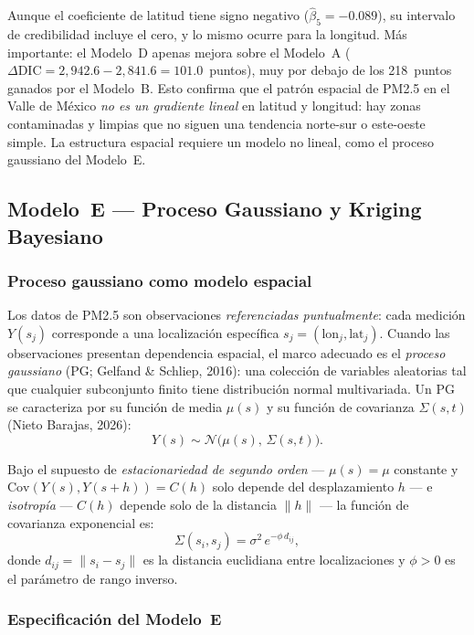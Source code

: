 \documentclass[12pt]{article}
\begin{document}
Aunque el coeficiente de latitud tiene signo negativo
($\hat\beta_5 = -0.089$), su intervalo de credibilidad incluye el cero,
y lo mismo ocurre para la longitud.
M\'as importante: el Modelo~D apenas mejora sobre el Modelo~A
($\Delta\text{DIC} = 2{,}942.6 - 2{,}841.6 = 101.0$~puntos),
muy por debajo de los 218~puntos ganados por el Modelo~B.
Esto confirma que el patr\'on espacial de PM2.5 en el Valle de M\'exico
\emph{no es un gradiente lineal} en latitud y longitud: hay zonas
contaminadas y limpias que no siguen una tendencia norte-sur o este-oeste
simple.
La estructura espacial requiere un modelo no lineal, como el proceso
gaussiano del Modelo~E.


\subsection{Modelo~E --- Proceso Gaussiano y Kriging Bayesiano}

\subsubsection*{Proceso gaussiano como modelo espacial}

Los datos de PM2.5 son observaciones \emph{referenciadas puntualmente}:
cada medici\'on $Y(s_j)$ corresponde a una localizaci\'on espec\'ifica
$s_j = (\text{lon}_j, \text{lat}_j)$.
Cuando las observaciones presentan dependencia espacial, el marco adecuado
es el \emph{proceso gaussiano} (PG; Gelfand \& Schliep, 2016): una colecci\'on de variables aleatorias
tal que cualquier subconjunto finito tiene distribuci\'on normal multivariada.
Un PG se caracteriza por su funci\'on de media $\mu(s)$ y su funci\'on de
covarianza $\Sigma(s, t)$ (Nieto Barajas, 2026):
\[
  Y(s) \sim \mathcal{N}\!\bigl(\mu(s),\,\Sigma(s,t)\bigr).
\]

Bajo el supuesto de \emph{estacionariedad de segundo orden} ---
$\mu(s) = \mu$ constante y $\text{Cov}(Y(s), Y(s+h)) = C(h)$ solo depende
del desplazamiento $h$ --- e \emph{isotrop\'ia} --- $C(h)$ depende solo de
la distancia $\|h\|$ --- la funci\'on de covarianza exponencial es:
\[
  \Sigma(s_i, s_j) = \sigma^2\, e^{-\phi\, d_{ij}},
\]
donde $d_{ij} = \|s_i - s_j\|$ es la distancia euclidiana entre
localizaciones y $\phi > 0$ es el par\'ametro de rango inverso.

\subsubsection*{Especificaci\'on del Modelo~E}
\end{document}
